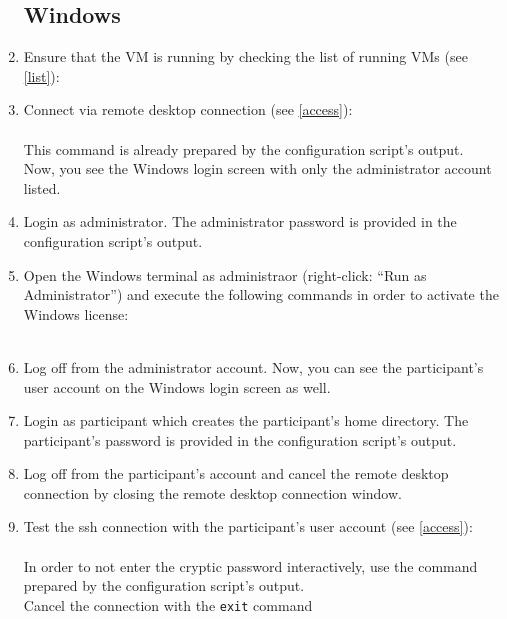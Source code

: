 \begin{enumerate}
\setcounter{enumi}{3}
\subsection*{Windows}
\item Ensure that the VM is running by checking the list of running VMs (see \ref{list}):
\item Connect via remote desktop connection (see \ref{access}):\\
\\
This command is already prepared by the configuration script's output.\\
Now, you see the Windows login screen with only the administrator account listed.
\item Login as administrator. The administrator password is provided in the configuration script's output.
\item Open the Windows terminal as administraor (right-click: ``Run as Administrator'') and execute the following commands in order to activate the Windows license:\\
\\
\item Log off from the administrator account. Now, you can see the participant's user account on the Windows login screen as well.
\item Login as participant which creates the participant's home directory. The participant's password is provided in the configuration script's output. 
\item Log off from the participant's account and cancel the remote desktop connection by closing the remote desktop connection window.
\item Test the ssh connection with the participant's user account (see \ref{access}):\\
\\
In order to not enter the cryptic password interactively, use the command prepared by the configuration script's output.\\
Cancel the connection with the \texttt{exit} command
\end{enumerate}

